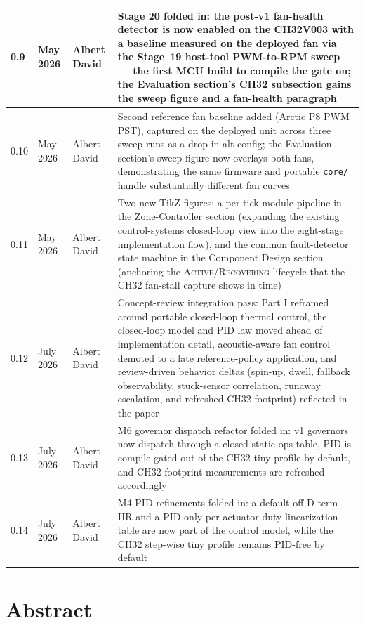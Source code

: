 \documentclass[11pt,a4paper]{article}
\begin{document}
\begin{longtable}{|p{}|p{}|p{}|p{}|}
    \hline
    0.9 & May 2026 & Albert David & Stage 20 folded in: the post-v1 fan-health detector is now enabled on the CH32V003 with a baseline measured on the deployed fan via the Stage~19 host-tool PWM-to-RPM sweep --- the first MCU build to compile the gate on; the Evaluation section's CH32 subsection gains the sweep figure and a fan-health paragraph \\
    \hline
    0.10 & May 2026 & Albert David & Second reference fan baseline added (Arctic P8 PWM PST), captured on the deployed unit across three sweep runs as a drop-in alt config; the Evaluation section's sweep figure now overlays both fans, demonstrating the same firmware and portable \texttt{core/} handle substantially different fan curves \\
    \hline
    0.11 & May 2026 & Albert David & Two new TikZ figures: a per-tick module pipeline in the Zone-Controller section (expanding the existing control-systems closed-loop view into the eight-stage implementation flow), and the common fault-detector state machine in the Component Design section (anchoring the \textsc{Active}/\textsc{Recovering} lifecycle that the CH32 fan-stall capture shows in time) \\
    \hline
    0.12 & July 2026 & Albert David & Concept-review integration pass: Part I reframed around portable closed-loop thermal control, the closed-loop model and PID law moved ahead of implementation detail, acoustic-aware fan control demoted to a late reference-policy application, and review-driven behavior deltas (spin-up, dwell, fallback observability, stuck-sensor correlation, runaway escalation, and refreshed CH32 footprint) reflected in the paper \\
    \hline
    0.13 & July 2026 & Albert David & M6 governor dispatch refactor folded in: v1 governors now dispatch through a closed static ops table, PID is compile-gated out of the CH32 tiny profile by default, and CH32 footprint measurements are refreshed accordingly \\
    \hline
    0.14 & July 2026 & Albert David & M4 PID refinements folded in: a default-off D-term IIR and a PID-only per-actuator duty-linearization table are now part of the control model, while the CH32 step-wise tiny profile remains PID-free by default \\
    \hline
\end{longtable}

\section*{Abstract}
\end{document}
